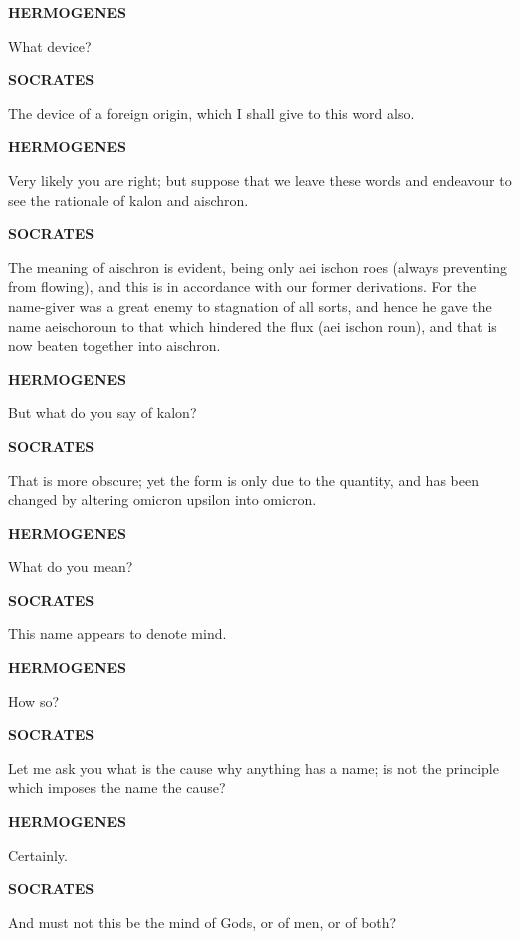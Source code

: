 \documentclass[11pt,letter]{article}
\begin{document}
\par \textbf{HERMOGENES}
\par   What device?

\par \textbf{SOCRATES}
\par   The device of a foreign origin, which I shall give to this word also.

\par \textbf{HERMOGENES}
\par   Very likely you are right; but suppose that we leave these words and endeavour to see the rationale of kalon and aischron.

\par \textbf{SOCRATES}
\par   The meaning of aischron is evident, being only aei ischon roes (always preventing from flowing), and this is in accordance with our former derivations. For the name-giver was a great enemy to stagnation of all sorts, and hence he gave the name aeischoroun to that which hindered the flux (aei ischon roun), and that is now beaten together into aischron.

\par \textbf{HERMOGENES}
\par   But what do you say of kalon?

\par \textbf{SOCRATES}
\par   That is more obscure; yet the form is only due to the quantity, and has been changed by altering omicron upsilon into omicron.

\par \textbf{HERMOGENES}
\par   What do you mean?

\par \textbf{SOCRATES}
\par   This name appears to denote mind.

\par \textbf{HERMOGENES}
\par   How so?

\par \textbf{SOCRATES}
\par   Let me ask you what is the cause why anything has a name; is not the principle which imposes the name the cause?

\par \textbf{HERMOGENES}
\par   Certainly.

\par \textbf{SOCRATES}
\par   And must not this be the mind of Gods, or of men, or of both?
\end{document}

